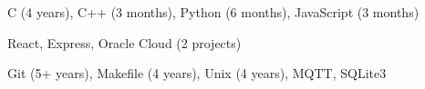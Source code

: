 
\begin{cvskills}
        {C (4 years), C++ (3 months), Python (6 months), JavaScript (3 months)} %

        {React, Express, Oracle Cloud (2 projects)} %
        
        {Git (5+ years), Makefile (4 years), Unix (4 years), MQTT, SQLite3}
\end{cvskills}
